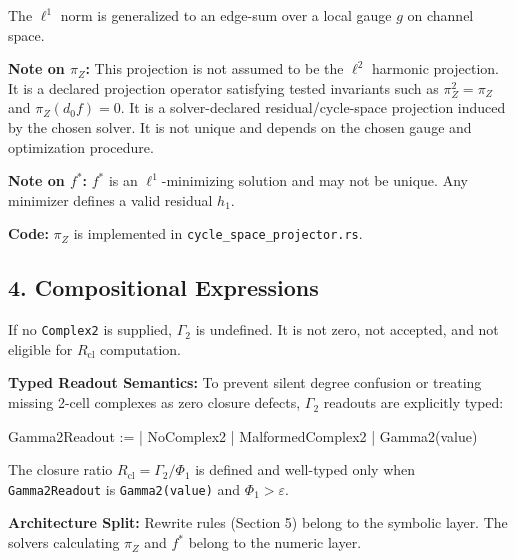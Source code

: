 \documentclass[
]{article}
\newenvironment{Shaded}{\begin{snugshade}}{\end{snugshade}}
\newcommand{\NormalTok}[1]{\textcolor[rgb]{0.12,0.11,0.11}{#1}}
\renewenvironment{quote}
  {\begin{leftbar}\small}
  {\end{leftbar}}
\begin{document}
The \(\ell^1\) norm is generalized to an edge-sum over a local gauge \(g\) on channel space.

\begin{quote}
\textbf{Note on \(\pi_Z\):} This projection is not assumed to be the \(\ell^2\) harmonic projection. It is a declared projection operator satisfying tested invariants such as \(\pi_Z^2=\pi_Z\) and \(\pi_Z(d_0f)=0\). It is a solver-declared residual/cycle-space projection induced by the chosen solver. It is not unique and depends on the chosen gauge and optimization procedure.
\end{quote}

\begin{quote}
\textbf{Note on \(f^*\):} \(f^*\) is an \(\ell^1\)-minimizing solution and may not be unique. Any minimizer defines a valid residual \(h_1\).
\end{quote}

\textbf{Code:} \(\pi_Z\) is implemented in \texttt{cycle\_space\_projector.rs}.

\subsection{4. Compositional Expressions}\label{compositional-expressions}

If no \texttt{Complex2} is supplied, \(\Gamma_2\) is undefined. It is not zero, not accepted, and not eligible for \(R_{\mathrm{cl}}\) computation.

\textbf{Typed Readout Semantics:}
To prevent silent degree confusion or treating missing 2-cell complexes as zero closure defects, \(\Gamma_2\) readouts are explicitly typed:

\begin{Shaded}
\begin{Highlighting}[]
\NormalTok{Gamma2Readout :=}
\NormalTok{  | NoComplex2}
\NormalTok{  | MalformedComplex2}
\NormalTok{  | Gamma2(value)}
\end{Highlighting}
\end{Shaded}

The closure ratio \(R_{\mathrm{cl}} = \Gamma_2 / \Phi_1\) is defined and well-typed only when \texttt{Gamma2Readout} is \texttt{Gamma2(value)} and \(\Phi_1 > \varepsilon\).

\begin{quote}
\textbf{Architecture Split:} Rewrite rules (Section 5) belong to the symbolic layer. The solvers calculating \(\pi_Z\) and \(f^*\) belong to the numeric layer.
\end{quote}
\end{document}
